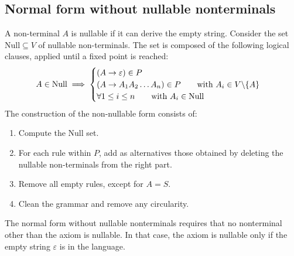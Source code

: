 \subsection{Normal form without nullable nonterminals}
A non-terminal $A$ is nullable if it can derive the empty string. 
Consider the set $\text{Null} \subseteq V$ of nullable non-terminals. 
The set is composed of the following logical clauses, applied until a fixed point is reached:
\[A \in \textnormal{Null} \implies\begin{cases}
    (A \rightarrow \varepsilon) \in P\\
    (A \rightarrow A_1A_2\dots A_n) \in P \qquad \textnormal{with } A_i \in V \backslash \{A\} \\
    \forall 1 \leq i \leq n \qquad \textnormal{with } A_i \in \textnormal{Null}
\end{cases}\]
The construction of the non-nullable form consists of:
\begin{enumerate}
    \item Compute the Null set. 
    \item For each rule within $P$, add as alternatives those obtained by deleting the nullable non-terminals from the right part.
    \item Remove all empty rules, except for $A=S$.
    \item Clean the grammar and remove any circularity.
\end{enumerate}
The normal form without nullable nonterminals requires that no nonterminal other than the axiom is nullable. 
In that case, the axiom is nullable only if the empty string $\varepsilon$ is in the language.

